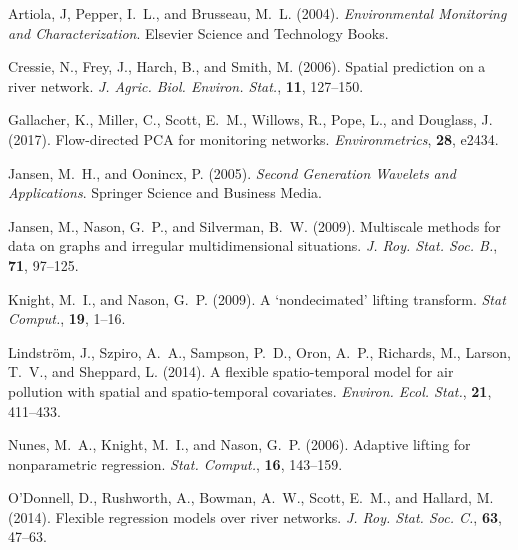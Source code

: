 \documentclass[11pt,titlepage]{article}
\begin{document}
\begin{thebibliography}{}

Artiola, J, Pepper, I.~L., and Brusseau, M.~L. (2004). {\em Environmental Monitoring and Characterization}. Elsevier Science and Technology Books.

Cressie, N., Frey, J., Harch, B., and Smith, M. (2006). Spatial prediction on a river network. {\em J. Agric. Biol. Environ. Stat.}, {\bf 11}, 127--150.

Gallacher, K., Miller, C., Scott, E.~M., Willows, R., Pope, L., and Douglass, J. (2017). Flow-directed PCA for monitoring networks. {\em Environmetrics}, {\bf 28}, e2434. 

Jansen, M.~H., and Oonincx, P. (2005). {\em Second Generation Wavelets and Applications}. Springer Science and Business Media.

Jansen, M., Nason, G.~P., and Silverman, B.~W. (2009). Multiscale methods for data on graphs and irregular multidimensional situations. {\em J. Roy. Stat. Soc. B.}, {\bf 71}, 97--125.

Knight, M.~I., and Nason, G.~P. (2009). A `nondecimated' lifting transform. {\em Stat Comput.}, {\bf 19}, 1--16.

Lindstr\"{o}m, J., Szpiro, A.~A., Sampson, P.~D., Oron, A.~P., Richards, M., Larson, T.~V., and Sheppard, L. (2014). A flexible spatio-temporal model for air pollution with spatial and spatio-temporal covariates. {\em Environ. Ecol. Stat.}, {\bf 21}, 411--433. 


Nunes, M.~A., Knight, M.~I., and Nason, G.~P. (2006). Adaptive lifting for nonparametric regression. {\em Stat. Comput.}, {\bf 16}, 143--159.

O'Donnell, D., Rushworth, A., Bowman, A.~W., Scott, E.~M., and Hallard, M. (2014). Flexible regression models over river networks. {\em J. Roy. Stat. Soc. C.}, {\bf 63}, 47--63.


\end{thebibliography}
\end{document}
